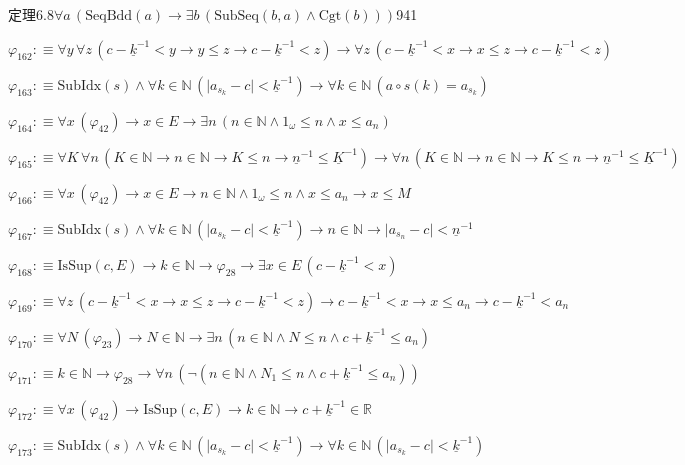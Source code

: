 \begin{fullproof}{定理6.8}{$\forall a\,(\mathrm{SeqBdd}(a) \to \exists b\,(\mathrm{SubSeq}(b,a) \land \mathrm{Cgt}(b)))$}{941}
\begin{abbrevlist}
\item $\varphi_{162} :\equiv \forall y\,\forall z\,(c - \underline{k}^{-1} < y \to y \leq z \to c - \underline{k}^{-1} < z) \to \forall z\,(c - \underline{k}^{-1} < x \to x \leq z \to c - \underline{k}^{-1} < z)$
\item $\varphi_{163} :\equiv \mathrm{SubIdx}(s) \land \forall k \in \mathbb{N}\,(\lvert a_{s_{k}} - c \rvert < \underline{k}^{-1}) \to \forall k \in \mathbb{N}\,(a \circ s(k) = a_{s_{k}})$
\item $\varphi_{164} :\equiv \forall x\,(\varphi_{42}) \to x \in E \to \exists n\,(n \in \mathbb{N} \land 1_{\omega} \leq n \land x \leq a_{n})$
\item $\varphi_{165} :\equiv \forall K\,\forall n\,(K \in \mathbb{N} \to n \in \mathbb{N} \to K \leq n \to \underline{n}^{-1} \leq \underline{K}^{-1}) \to \forall n\,(K \in \mathbb{N} \to n \in \mathbb{N} \to K \leq n \to \underline{n}^{-1} \leq \underline{K}^{-1})$
\item $\varphi_{166} :\equiv \forall x\,(\varphi_{42}) \to x \in E \to n \in \mathbb{N} \land 1_{\omega} \leq n \land x \leq a_{n} \to x \leq M$
\item $\varphi_{167} :\equiv \mathrm{SubIdx}(s) \land \forall k \in \mathbb{N}\,(\lvert a_{s_{k}} - c \rvert < \underline{k}^{-1}) \to n \in \mathbb{N} \to \lvert a_{s_{n}} - c \rvert < \underline{n}^{-1}$
\item $\varphi_{168} :\equiv \mathrm{IsSup}(c,E) \to k \in \mathbb{N} \to \varphi_{28} \to \exists x \in E\,(c - \underline{k}^{-1} < x)$
\item $\varphi_{169} :\equiv \forall z\,(c - \underline{k}^{-1} < x \to x \leq z \to c - \underline{k}^{-1} < z) \to c - \underline{k}^{-1} < x \to x \leq a_{n} \to c - \underline{k}^{-1} < a_{n}$
\item $\varphi_{170} :\equiv \forall N\,(\varphi_{23}) \to N \in \mathbb{N} \to \exists n\,(n \in \mathbb{N} \land N \leq n \land c + \underline{k}^{-1} \leq a_{n})$
\item $\varphi_{171} :\equiv k \in \mathbb{N} \to \varphi_{28} \to \forall n\,(\neg (n \in \mathbb{N} \land N_{1} \leq n \land c + \underline{k}^{-1} \leq a_{n}))$
\item $\varphi_{172} :\equiv \forall x\,(\varphi_{42}) \to \mathrm{IsSup}(c,E) \to k \in \mathbb{N} \to c + \underline{k}^{-1} \in \mathbb{R}$
\item $\varphi_{173} :\equiv \mathrm{SubIdx}(s) \land \forall k \in \mathbb{N}\,(\lvert a_{s_{k}} - c \rvert < \underline{k}^{-1}) \to \forall k \in \mathbb{N}\,(\lvert a_{s_{k}} - c \rvert < \underline{k}^{-1})$

\end{abbrevlist}
\end{fullproof}
